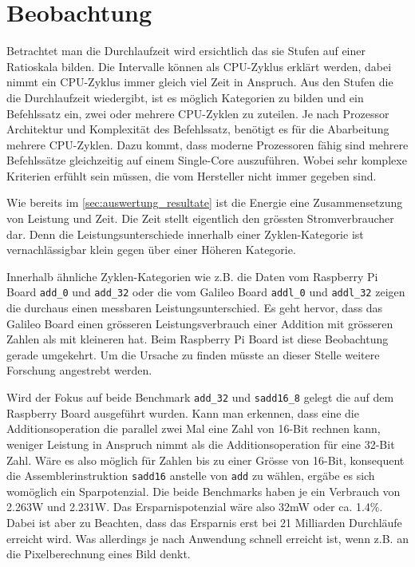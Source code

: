 





\section{Beobachtung}

Betrachtet man die Durchlaufzeit wird ersichtlich das sie Stufen auf einer Ratioskala bilden. Die Intervalle können als CPU-Zyklus erklärt werden, dabei nimmt ein CPU-Zyklus immer gleich viel Zeit in Anspruch. Aus den Stufen die die Durchlaufzeit wiedergibt, ist es möglich Kategorien zu bilden und ein Befehlssatz ein, zwei oder mehrere CPU-Zyklen zu zuteilen. Je nach Prozessor Architektur und Komplexität des Befehlssatz, benötigt es für die Abarbeitung mehrere CPU-Zyklen. Dazu kommt, dass moderne Prozessoren fähig sind mehrere Befehlssätze gleichzeitig auf einem Single-Core auszuführen. Wobei sehr komplexe Kriterien erfühlt sein müssen, die vom Hersteller nicht immer gegeben sind.
\par
Wie bereits im \autoref{sec:auswertung_resultate} ist die Energie eine Zusammensetzung von Leistung und Zeit. Die Zeit stellt eigentlich den grössten Stromverbraucher dar. Denn die Leistungsunterschiede innerhalb einer Zyklen-Kategorie ist vernachlässigbar klein gegen über einer Höheren Kategorie.
\par
Innerhalb ähnliche Zyklen-Kategorien wie z.B. die Daten vom Raspberry Pi Board \texttt{add\_0} und \texttt{add\_32} oder die vom Galileo Board \texttt{addl\_0} und \texttt{addl\_32} zeigen die durchaus einen messbaren Leistungsunterschied. Es geht hervor, dass das Galileo Board einen grösseren Leistungsverbrauch einer Addition mit grösseren Zahlen als mit kleineren hat. Beim Raspberry Pi Board ist diese Beobachtung gerade umgekehrt. Um die Ursache zu finden müsste an dieser Stelle weitere Forschung angestrebt werden.
\par
Wird der Fokus auf beide Benchmark \texttt{add\_32} und \texttt{sadd16\_8} gelegt die auf dem Raspberry Board ausgeführt wurden. Kann man erkennen,  dass eine die Additionsoperation die parallel zwei Mal eine Zahl von 16-Bit rechnen kann, weniger Leistung in Anspruch nimmt als die Additionsoperation für eine 32-Bit Zahl. Wäre es also möglich für Zahlen bis zu einer Grösse von 16-Bit, konsequent die Assemblerinstruktion \texttt{sadd16} anstelle von \texttt{add} zu wählen, ergäbe es sich womöglich ein Sparpotenzial. Die beide Benchmarks haben je ein Verbrauch von 2.263W und 2.231W. Das Ersparnispotenzial wäre also 32mW oder ca. 1.4\%. Dabei ist aber zu Beachten, dass das Ersparnis erst bei 21 Milliarden Durchläufe erreicht wird. Was allerdings je nach Anwendung schnell erreicht ist, wenn z.B. an die Pixelberechnung eines Bild denkt.
\par















